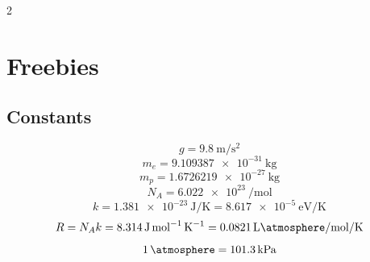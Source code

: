 \begin{multicols*}{2}
\section{Freebies}\label{sec:freebies}


\subsection{Constants}

\begin{equation*}
    g = \qty{9.8}{\meter\per\square\second}
\end{equation*}
\begin{equation*}
    m_e = \qty{9.109387e-31}{\kilo\gram}
\end{equation*}
\begin{equation*}
    m_p = \qty{1.6726219e-27}{\kilo\gram}
\end{equation*}
\begin{equation*}
    N_A = \qty{6.022e23}{\per\mol}
\end{equation*}
\begin{equation*}
    k = \qty{1.381e-23}{\joule\per\kelvin} = \qty{8.617e-5}{\electronvolt\per\kelvin}
\end{equation*}
\begin{equation*}
    R = N_A k = \qty{8.314}{\joule\per\mol\per\kelvin} =
                \qty{0.0821}{\liter\atmosphere\per\mol\per\kelvin}
\end{equation*}
\begin{equation*}
    \qty{1}{\atmosphere} = \qty{101.3}{\kilo\pascal}
\end{equation*}



\end{multicols*}
